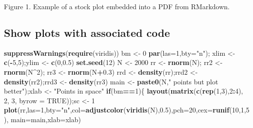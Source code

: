 \documentclass[article]{article}
\newenvironment{Shaded}{\begin{snugshade}}{\end{snugshade}}
\newcommand{\KeywordTok}[1]{\textcolor[rgb]{0.13,0.29,0.53}{\textbf{#1}}}
\newcommand{\DataTypeTok}[1]{\textcolor[rgb]{0.13,0.29,0.53}{#1}}
\newcommand{\DecValTok}[1]{\textcolor[rgb]{0.00,0.00,0.81}{#1}}
\newcommand{\FloatTok}[1]{\textcolor[rgb]{0.00,0.00,0.81}{#1}}
\newcommand{\StringTok}[1]{\textcolor[rgb]{0.31,0.60,0.02}{#1}}
\newcommand{\OtherTok}[1]{\textcolor[rgb]{0.56,0.35,0.01}{#1}}
\newcommand{\ControlFlowTok}[1]{\textcolor[rgb]{0.13,0.29,0.53}{\textbf{#1}}}
\newcommand{\OperatorTok}[1]{\textcolor[rgb]{0.81,0.36,0.00}{\textbf{#1}}}
\newcommand{\NormalTok}[1]{#1}
\begin{document}
Figure 1. Example of a stock plot embedded into a PDF from RMarkdown.

\newpage

\subsection{Show plots with associated
code}\label{show-plots-with-associated-code}

\begin{Shaded}
\begin{Highlighting}[]
\KeywordTok{suppressWarnings}\NormalTok{(}\KeywordTok{require}\NormalTok{(viridis))}
\NormalTok{bm <-}\StringTok{ }\DecValTok{0}
\KeywordTok{par}\NormalTok{(}\DataTypeTok{las=}\DecValTok{1}\NormalTok{,}\DataTypeTok{bty=}\StringTok{"n"}\NormalTok{); xlim <-}\StringTok{ }\KeywordTok{c}\NormalTok{(}\OperatorTok{-}\DecValTok{5}\NormalTok{,}\DecValTok{5}\NormalTok{);ylim <-}\StringTok{ }\KeywordTok{c}\NormalTok{(}\DecValTok{0}\NormalTok{,}\FloatTok{0.5}\NormalTok{)}
\KeywordTok{set.seed}\NormalTok{(}\DecValTok{12}\NormalTok{)}
\NormalTok{N <-}\StringTok{ }\DecValTok{2000}
\NormalTok{rr <-}\StringTok{ }\KeywordTok{rnorm}\NormalTok{(N); rr2 <-}\StringTok{ }\KeywordTok{rnorm}\NormalTok{(N}\OperatorTok{^}\DecValTok{2}\NormalTok{); rr3 <-}\StringTok{ }\KeywordTok{rnorm}\NormalTok{(N}\OperatorTok{+}\FloatTok{0.3}\NormalTok{)}
\NormalTok{rrd <-}\StringTok{ }\KeywordTok{density}\NormalTok{(rr);rrd2 <-}\StringTok{ }\KeywordTok{density}\NormalTok{(rr2);rrd3 <-}\StringTok{ }\KeywordTok{density}\NormalTok{(rr3)}
\NormalTok{main <-}\StringTok{ }\KeywordTok{paste0}\NormalTok{(N,}\StringTok{" points but plot better"}\NormalTok{);xlab <-}\StringTok{ "Points in space"}
\ControlFlowTok{if}\NormalTok{(bm}\OperatorTok{==}\DecValTok{1}\NormalTok{)\{}
  \KeywordTok{layout}\NormalTok{(}\KeywordTok{matrix}\NormalTok{(}\KeywordTok{c}\NormalTok{(}\KeywordTok{rep}\NormalTok{(}\DecValTok{1}\NormalTok{,}\DecValTok{3}\NormalTok{),}\DecValTok{2}\OperatorTok{:}\DecValTok{4}\NormalTok{), }\DecValTok{2}\NormalTok{, }\DecValTok{3}\NormalTok{, }\DataTypeTok{byrow =} \OtherTok{TRUE}\NormalTok{));sc <-}\StringTok{ }\DecValTok{1}
  \KeywordTok{plot}\NormalTok{(rr,}\DataTypeTok{las=}\DecValTok{1}\NormalTok{,}\DataTypeTok{bty=}\StringTok{"n"}\NormalTok{,}\DataTypeTok{col=}\KeywordTok{adjustcolor}\NormalTok{(}\KeywordTok{viridis}\NormalTok{(N),}\FloatTok{0.5}\NormalTok{),}\DataTypeTok{pch=}\DecValTok{20}\NormalTok{,}\DataTypeTok{cex=}\KeywordTok{runif}\NormalTok{(}\DecValTok{10}\NormalTok{,}\DecValTok{1}\NormalTok{,}\DecValTok{5}\NormalTok{),}
       \DataTypeTok{main=}\NormalTok{main,}\DataTypeTok{xlab=}\NormalTok{xlab)}

\end{Highlighting}
\end{Shaded}
\end{document}
